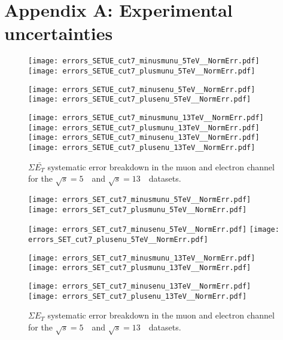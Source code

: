 \chapter*{Appendix A: Experimental uncertainties}


\begin{figure}[h]
	\centering
	{\texttt{[image: errors\_SETUE\_cut7\_minusmunu\_5TeV\_\_NormErr.pdf]}\label{f:SETUEmm5}}
	{\texttt{[image: errors\_SETUE\_cut7\_plusmunu\_5TeV\_\_NormErr.pdf]}\label{f:SETUEpm5}}
	
	{\texttt{[image: errors\_SETUE\_cut7\_minusenu\_5TeV\_\_NormErr.pdf]}\label{f:}}
	{\texttt{[image: errors\_SETUE\_cut7\_plusenu\_5TeV\_\_NormErr.pdf]}\label{f:}}
	
	{\texttt{[image: errors\_SETUE\_cut7\_minusmunu\_13TeV\_\_NormErr.pdf]}\label{f:SETUEmm13}}
	{\texttt{[image: errors\_SETUE\_cut7\_plusmunu\_13TeV\_\_NormErr.pdf]}\label{f:SETUEpm13}}
	{\texttt{[image: errors\_SETUE\_cut7\_minusenu\_13TeV\_\_NormErr.pdf]}\label{f:}}
	{\texttt{[image: errors\_SETUE\_cut7\_plusenu\_13TeV\_\_NormErr.pdf]}\label{f:}}
	
	\caption{$\Sigma \bar{E_T}$ systematic error breakdown in the muon and electron channel  for the $\sqrt{s} = 5$~\TeV\ and $\sqrt{s} = 13$~\TeV\ datasets.}
\end{figure}
%

\begin{figure}[h]
	\centering
	{\texttt{[image: errors\_SET\_cut7\_minusmunu\_5TeV\_\_NormErr.pdf]}\label{f:set5}}
	{\texttt{[image: errors\_SET\_cut7\_plusmunu\_5TeV\_\_NormErr.pdf]}\label{f:setpl}}
	
	{\texttt{[image: errors\_SET\_cut7\_minusenu\_5TeV\_\_NormErr.pdf]}\label{f:}}
	{\texttt{[image: errors\_SET\_cut7\_plusenu\_5TeV\_\_NormErr.pdf]}\label{f:}}
	
	{\texttt{[image: errors\_SET\_cut7\_minusmunu\_13TeV\_\_NormErr.pdf]}\label{f:set13}}
	{\texttt{[image: errors\_SET\_cut7\_plusmunu\_13TeV\_\_NormErr.pdf]}\label{f:setpl13}}
	
	{\texttt{[image: errors\_SET\_cut7\_minusenu\_13TeV\_\_NormErr.pdf]}\label{f:}}
	{\texttt{[image: errors\_SET\_cut7\_plusenu\_13TeV\_\_NormErr.pdf]}\label{f:}}
		
	\caption{$\Sigma{E_T}$ systematic error breakdown in the muon and electron channel  for the $\sqrt{s} = 5$~\TeV\ and $\sqrt{s} = 13$~\TeV\ datasets.}
\end{figure}
\newpage


